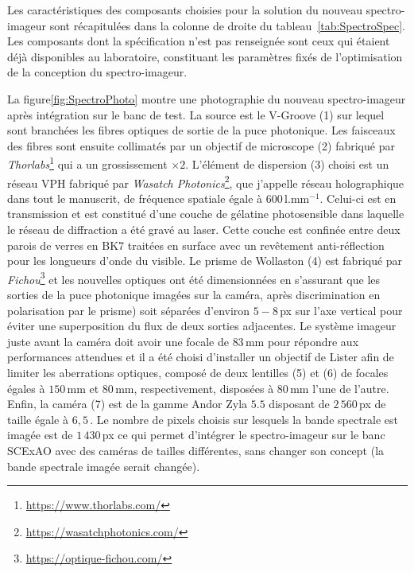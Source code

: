 Les caractéristiques des composants choisies pour la solution du nouveau spectro-imageur sont récapitulées dans la colonne de droite du tableau~\ref{tab:SpectroSpec}. Les composants dont la spécification n'est pas renseignée sont ceux qui étaient déjà disponibles au laboratoire, constituant les paramètres fixés de l'optimisation de la conception du spectro-imageur. 

La figure\ref{fig:SpectroPhoto} montre une photographie du nouveau spectro-imageur après intégration sur le banc de test. La source est le V-Groove (1) sur lequel sont branchées les fibres optiques de sortie de la puce photonique. Les faisceaux des fibres sont ensuite collimatés par un objectif de microscope (2) fabriqué par \textit{Thorlabs}\footnote{\url{https://www.thorlabs.com/}} qui a un grossissement $\times 2$. L'élément de dispersion (3) choisi est un réseau \ac{VPH} fabriqué par \textit{Wasatch Photonics}\footnote{\url{https://wasatchphotonics.com/}}, que j'appelle réseau holographique dans tout le manuscrit, de fréquence spatiale égale à $600 \,\text{l}.\text{mm}^{-1}$. Celui-ci est en transmission et est constitué d'une couche de gélatine photosensible dans laquelle le réseau de diffraction a été gravé au laser. Cette couche est confinée entre deux parois de verres en BK7 traitées en surface avec un revêtement anti-réflection pour les longueurs d'onde du visible. Le prisme de Wollaston (4) est fabriqué par \textit{Fichou}\footnote{\url{https://optique-fichou.com/}} et les nouvelles optiques ont été dimensionnées en s'assurant que les sorties de la puce photonique imagées sur la caméra, après discrimination en polarisation par le prisme) soit séparées d'environ $5-8 \,$px sur l'axe vertical pour éviter une superposition du flux de deux sorties adjacentes. Le système imageur juste avant la caméra doit avoir une focale de $83 \,$mm pour répondre aux performances attendues et il a été choisi d'installer un objectif de Lister afin de limiter les aberrations optiques, composé de deux lentilles (5) et (6) de focales égales à $150 \,$mm et $80 \,$mm, respectivement, disposées à $80 \,$mm l'une de l'autre. Enfin, la caméra (7) est de la gamme Andor Zyla $5.5$ disposant de $2\,560 \,$px de taille égale à $6,5 \,$\um. Le nombre de pixels choisis sur lesquels la bande spectrale est imagée est de $1\,430 \,$px ce qui permet d'intégrer le spectro-imageur sur le banc \ac{SCExAO} avec des caméras de tailles différentes, sans changer son concept (la bande spectrale imagée serait changée).

